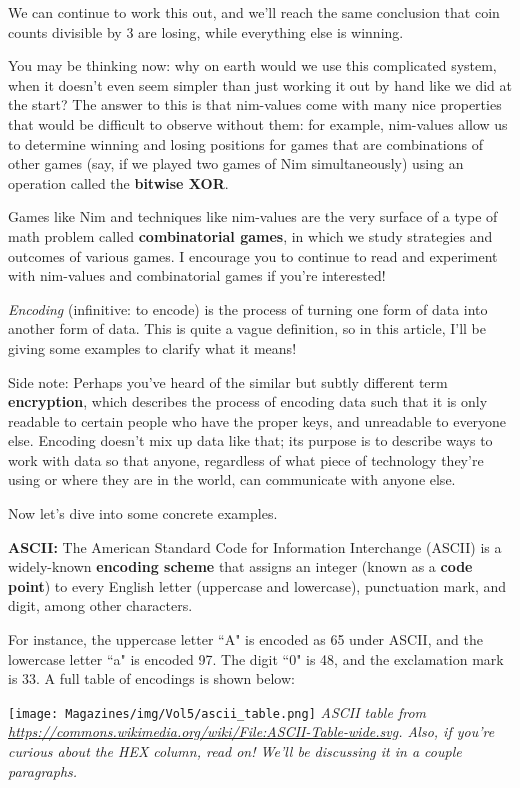 \documentclass{article}
\begin{document}
\begin{multicols}{3}
We can continue to work this out, and we'll reach the same conclusion that coin counts divisible by $3$ are losing, while everything else is winning.

You may be thinking now: why on earth would we use this complicated system, when it doesn't even seem simpler than just working it out by hand like we did at the start? The answer to this is that nim-values come with many nice properties that would be difficult to observe without them: for example, nim-values allow us to determine winning and losing positions for games that are combinations of other games (say, if we played two games of Nim simultaneously) using an operation called the \textbf{bitwise XOR}. 

Games like Nim and techniques like nim-values are the very surface of a type of math problem called \textbf{combinatorial games}, in which we study strategies and outcomes of various games. I encourage you to continue to read and experiment with nim-values and combinatorial games if you're interested!
\closearticle

\textit{Encoding} (infinitive: to encode) is the process of turning one form of data into another form of data. This is quite a vague definition, so in this article, I'll be giving some examples to clarify what it means!

Side note: Perhaps you've heard of the similar but subtly different term \textbf{encryption}, which describes the process of encoding data such that it is only readable to certain people who have the proper keys, and unreadable to everyone else. Encoding doesn't mix up data like that; its purpose is to describe ways to work with data so that anyone, regardless of what piece of technology they're using or where they are in the world, can communicate with anyone else.

Now let's dive into some concrete examples.

\textbf{ASCII:}
The American Standard Code for Information Interchange (ASCII) is a widely-known \textbf{encoding scheme} that assigns an integer (known as a \textbf{code point}) to every English letter (uppercase and lowercase), punctuation mark, and digit, among other characters.

For instance, the uppercase letter ``A" is encoded as 65 under ASCII, and the lowercase letter ``a" is encoded 97. The digit ``0" is 48, and the exclamation mark is 33. A full table of encodings is shown below:

\begin{center}
    \footnotesize
    \texttt{[image: Magazines/img/Vol5/ascii\_table.png]}
    \textit{ASCII table from \url{https://commons.wikimedia.org/wiki/File:ASCII-Table-wide.svg}. Also, if you're curious about the HEX column, read on! We'll be discussing it in a couple paragraphs.}
\end{center}


\end{multicols}
\end{document}
